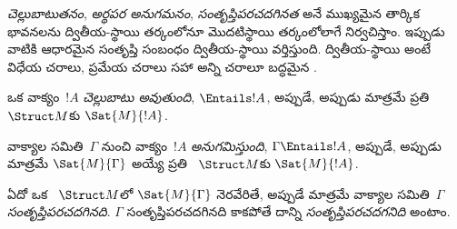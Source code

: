 \documentclass[../../../include/open-logic-section]{subfiles}
\begin{document}

\begin{explain}
\emph{చెల్లుబాటుతనం}, \emph{అర్థపర అనుగమనం}, \emph{సంతృప్తిపరచదగినత}
అనే ముఖ్యమైన తార్కిక భావనలను ద్వితీయ-స్థాయి తర్కంలోనూ మొదటిస్థాయి
తర్కంలోలాగే నిర్వచిస్తాం. ఇప్పుడు వాటికి ఆధారమైన సంతృప్తి సంబంధం
ద్వితీయ-స్థాయి  వర్తిస్తుంది. ద్వితీయ-స్థాయి
 అంటే విధేయ చరాలు, ప్రమేయ చరాలు సహా అన్ని చరాలూ బద్ధమైన
.
\end{explain}

\begin{defn}[చెల్లుబాటుతనం]
ఒక వాక్యం~$!A$ \emph{చెల్లుబాటు అవుతుంది}, $\Entails !A$, అప్పుడే,
అప్పుడు మాత్రమే ప్రతి ~$\Struct M$కు $\Sat{M}{!A}$.
\end{defn}

\begin{defn}
వాక్యాల సమితి~$\Gamma$ నుంచి వాక్యం~$!A$ \emph{అనుగమిస్తుంది},
$\Gamma \Entails !A$, అప్పుడే, అప్పుడు మాత్రమే $\Sat{M}{\Gamma}$
అయ్యే ప్రతి ~$\Struct M$కు $\Sat{M}{!A}$.
\end{defn}

\begin{defn}
ఏదో ఒక ~$\Struct M$లో $\Sat{M}{\Gamma}$ నెరవేరితే, అప్పుడే మాత్రమే
వాక్యాల సమితి~$\Gamma$ \emph{సంతృప్తిపరచదగినది}. $\Gamma$
సంతృప్తిపరచదగినది కాకపోతే దాన్ని \emph{సంతృప్తిపరచదగనిది} అంటాం.
\end{defn}
\end{document}
